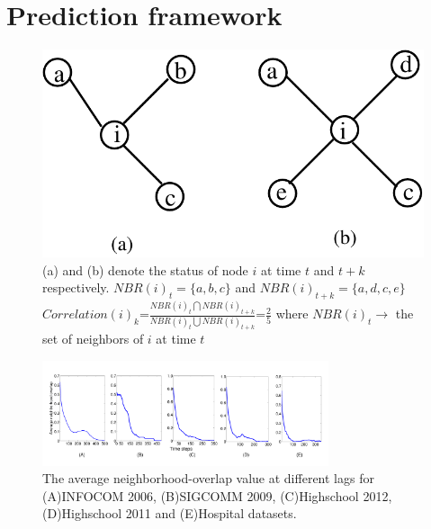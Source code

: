 \noindent

 \section{Prediction framework}
 \label{prediction}
 

\begin{figure}
 \begin{center}
 \includegraphics[width=0.45\columnwidth, angle=0]{./texfiles/Chapter_1/fig/jaccard-eps-converted-to.pdf}
 \caption{\label{fig2}(a) and (b) denote the status of node $i$ at time $t$ and $t+k$ respectively. $NBR(i)_{t}=\{a,b,c\}$ and $NBR(i)_{t+k}=\{a,d,c,e\}$ 
 $Correlation(i)_{k}$={\large$\frac{NBR(i)_{t}\bigcap NBR(i)_{t+k}}{NBR(i)_{t}\bigcup NBR(i)_{t+k}}$}={\large$\frac{2}{5}$} where $NBR(i)_{t}\rightarrow$ the set of neighbors of $i$ at time $t$}
  \end{center}
 \end{figure}
  
 \begin{figure}
 \centering
   \includegraphics*[width=0.75\textwidth,angle=0]{./texfiles/Chapter_1/fig/age_all_5-eps-converted-to.pdf}
 \caption{\label{aging}The average neighborhood-overlap value at different lags for (A)INFOCOM 2006, (B)SIGCOMM 2009, (C)Highschool 2012, (D)Highschool 2011 and (E)Hospital datasets.}
 \end{figure}





